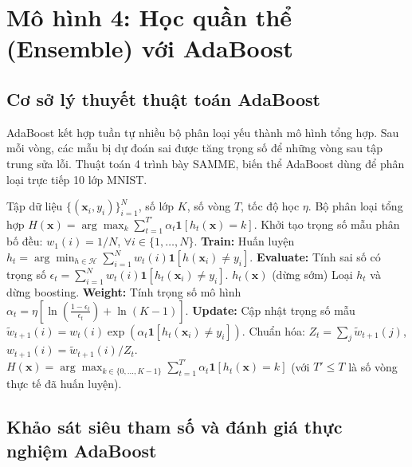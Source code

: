 \documentclass[11pt,a4paper]{article}
\begin{document}
\section{Mô hình 4: Học quần thể (Ensemble) với AdaBoost}

\subsection{Cơ sở lý thuyết thuật toán AdaBoost}
AdaBoost kết hợp tuần tự nhiều bộ phân loại yếu thành mô hình tổng hợp. Sau mỗi vòng, các mẫu bị dự đoán sai được tăng trọng số để những vòng sau tập trung sửa lỗi. Thuật toán 4 trình bày SAMME, biến thể AdaBoost dùng để phân loại trực tiếp 10 lớp MNIST.

\begin{algorithm}[H]
\caption{Huấn luyện Học quần thể AdaBoost đa lớp (SAMME)}
\label{alg:adaboost_samme}
\begin{algorithmic}[1]
\Require Tập dữ liệu $\{(\mathbf{x}_i, y_i)\}_{i=1}^{N}$, số lớp $K$, số vòng $T$, tốc độ học $\eta$.
\Ensure Bộ phân loại tổng hợp $H(\mathbf{x}) = \arg\max_k \sum_{t=1}^{T'} \alpha_t \mathbf{1}[h_t(\mathbf{x}) = k]$.
\State Khởi tạo trọng số mẫu phân bố đều: $w_1(i) = 1/N$, $\forall i \in \{1, \ldots, N\}$.
    \State \textbf{Train:} Huấn luyện $h_t = \arg\min_{h \in \mathcal{H}} \sum_{i=1}^{N} w_t(i) \mathbf{1}[h(\mathbf{x}_i) \neq y_i]$.
    \State \textbf{Evaluate:} Tính sai số có trọng số $\epsilon_t = \sum_{i=1}^{N} w_t(i) \mathbf{1}[h_t(\mathbf{x}_i) \neq y_i]$.
        \State \Return $h_t(\mathbf{x})$ (dừng sớm)
    \EndIf
        \State Loại $h_t$ và dừng boosting.
    \EndIf
    \State \textbf{Weight:} Tính trọng số mô hình $\alpha_t = \eta \left[ \ln\left(\frac{1-\epsilon_t}{\epsilon_t}\right) + \ln(K-1) \right]$.
    \State \textbf{Update:} Cập nhật trọng số mẫu $\widetilde{w}_{t+1}(i) = w_t(i) \exp(\alpha_t \mathbf{1}[h_t(\mathbf{x}_i) \neq y_i])$.
    \State Chuẩn hóa: $Z_t = \sum_j \widetilde{w}_{t+1}(j)$, $w_{t+1}(i) = \widetilde{w}_{t+1}(i) / Z_t$.
\EndFor
\State \Return $H(\mathbf{x}) = \arg\max_{k \in \{0, \ldots, K-1\}} \sum_{t=1}^{T'} \alpha_t \mathbf{1}[h_t(\mathbf{x}) = k]$ (với $T' \leq T$ là số vòng thực tế đã huấn luyện).
\end{algorithmic}
\end{algorithm}

\subsection{Khảo sát siêu tham số và đánh giá thực nghiệm AdaBoost}
\end{document}

